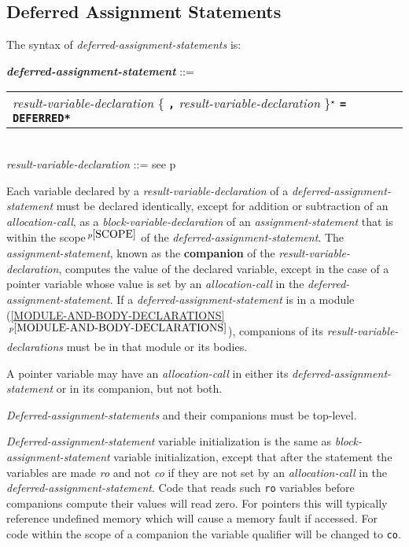 \documentclass[12pt]{article}
\newcommand{\TT}[1]{{\tt \bfseries #1}}
\newcommand{\STAR}{{\Large $^\star$}}
\newcommand{\key}[1]{{\rm \bfseries #1}}
\newcommand{\ttkey}[1]{{\tt \bfseries #1}}
\newcommand{\emkey}[1]{{\em \bfseries #1}}
\newcommand{\itemref}[1]{\ref{#1}$\,^{p\pageref{#1}}$}
\newcommand{\pagref}[1]{p\pageref{#1}}
\newcommand{\pagnote}[1]{$\,^{p\pageref{#1}}$}
\newenvironment{indpar}[1][0.3in]%
	{\begin{list}{}%
		     {\setlength{\itemsep}{0in}%
		      \setlength{\topsep}{0in}%
		      \setlength{\parsep}{1ex}%
		      \setlength{\labelwidth}{#1}%
		      \setlength{\leftmargin}{#1}%
		      \addtolength{\leftmargin}{\labelsep}}%
	 \item}%
	{\end{list}}
\begin{document}
\subsection{Deferred Assignment Statements}
\label{DEFERRED-ASSIGNMENT-STATEMENTS}

The syntax of {\em defer\-red-assignment-state\-ments} is:

\begin{indpar}
\emkey{deferred-assignment-statement} ::= \\
\hspace*{0.3in}
    \begin{tabular}[t]{@{}l}
        {\em result-variable-declaration}
                \{ \TT{,} {\em result-variable-declaration} \}\STAR{}
		     \TT{=} \ttkey{*DEFERRED*} \\
    \end{tabular}
\\[0.5ex]
{\em result-variable-declaration} ::=
    see \pagref{RESULT-VARIABLE-DECLARATION}
\end{indpar}

Each variable declared by a {\em result-variable-declaration}
of a {\em deferred-assignment-statement} must be declared identically,
except for addition or subtraction of an {\em allocation-call},
as a {\em block-variable-declaration} of an {\em assignment-statement}
that is within the scope\pagnote{SCOPE} of the
{\em deferred-assignment-statement}.  The {\em assignment-statement},
known as the \key{companion} of the {\em result-variable-declaration},
computes the value of the
declared variable, except in the case of a pointer variable whose value is
set by an {\em allocation-call} in the {\em deferred-assignment-statement}.
If a {\em deferred-assignment-statement} is in a module
(\itemref{MODULE-AND-BODY-DECLARATIONS}), companions
of its {\em result-variable-declarations}
must be in that module or its bodies.

A pointer variable may have an {\em allocation-call} in either its
{\em deferred-assignment-statement} or in its companion, but not
both.

{\em Deferred-assignment-statements} and their companions must be
top-level.

{\em Deferred-assignment-statement} variable initialization is the
same as {\em block-assignment-state\-ment} variable initialization,
except that after the statement the variables
are made {\em ro} and not {\em co} if they are not set
by an {\em allocation-call} in the {\em deferred-assignment-statement}.
Code that reads such {\tt ro} variables
before companions compute their values will
read zero.
For pointers this will typically reference undefined memory which
will cause a memory fault if accessed.
For code within the scope of a companion the
variable qualifier will be changed to {\tt co}.
\end{document}
